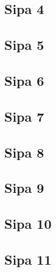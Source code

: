 \subsection{Sipa 4}
\subsection{Sipa 5}
\subsection{Sipa 6}
\subsection{Sipa 7}
\subsection{Sipa 8}
\subsection{Sipa 9}
\subsection{Sipa 10}
\subsection{Sipa 11}

